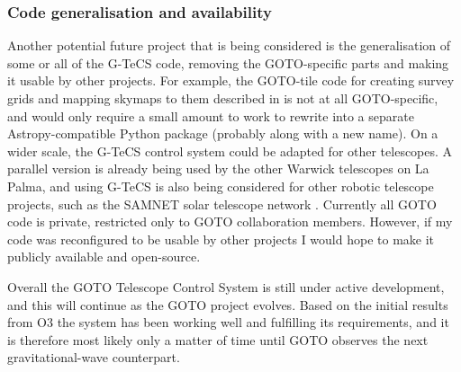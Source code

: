 \begin{colsection}
\subsubsection{Code generalisation and availability}

Another potential future project that is being considered is the generalisation of some or all of the G-TeCS code, removing the GOTO-specific parts and making it usable by other projects. For example, the GOTO-tile code for creating survey grids and mapping skymaps to them described in  is not at all GOTO-specific, and would only require a small amount to work to rewrite into a separate Astropy-compatible Python package (probably along with a new name). On a wider scale, the G-TeCS control system could be adapted for other telescopes. A parallel version is already being used by the other Warwick telescopes on La Palma, and using G-TeCS is also being considered for other robotic telescope projects, such as the SAMNET solar telescope network \citep{SAMNET}. Currently all GOTO code is private, restricted only to GOTO collaboration members. However, if my code was reconfigured to be usable by other projects I would hope to make it publicly available and open-source.

\bigskip

Overall the GOTO Telescope Control System is still under active development, and this will continue as the GOTO project evolves. Based on the initial results from O3 the system has been working well and fulfilling its requirements, and it is therefore most likely only a matter of time until GOTO observes the next gravitational-wave counterpart.

\end{colsection}


